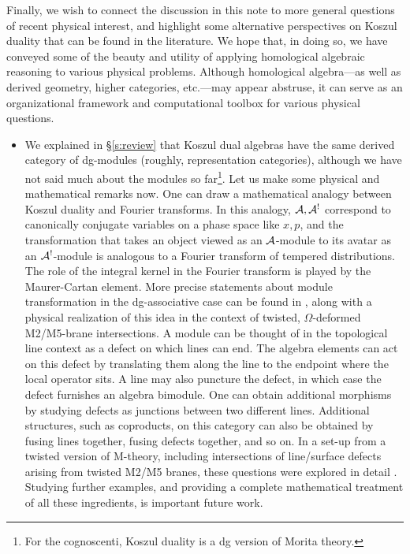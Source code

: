 \documentclass[11pt]{amsart}
\begin{document}
Finally, we wish to connect the discussion in this note to more general questions of recent physical interest, and highlight some alternative perspectives on Koszul duality that can be found in the literature. We hope that, in doing so, we have conveyed some of the beauty and utility of applying homological algebraic reasoning to various physical problems. Although homological algebra---as well as derived geometry, higher categories, etc.---may appear abstruse, it can serve as an organizational framework and computational toolbox for various physical questions.
\begin{itemize}
\item We explained in \S \ref{s:review} that Koszul dual algebras have the same derived category of dg-modules (roughly, representation categories), although we have not said much about the modules so far\footnote{For the cognoscenti, Koszul duality is a dg version of Morita theory.}. Let us make some physical and mathematical remarks now. One can draw a mathematical analogy between Koszul duality and Fourier transforms. In this analogy, $\mathcal A, \mathcal A^{!}$ correspond to canonically conjugate variables on a phase space like $x, p$, and the transformation that takes an object viewed as an $\mathcal A$-module to its avatar as an $\mathcal A^{!}$-module is analogous to a Fourier transform of tempered distributions. The role of the integral kernel in the Fourier transform is played by the Maurer-Cartan element.  More precise statements about module transformation in the dg-associative case can be found in \cite{GO}, along with a physical realization of this idea in the context of twisted, $\Omega$-deformed M2/M5-brane intersections. A module can be thought of in the topological line context as a defect on which lines can end. The algebra elements can act on this defect by translating them along the line to the endpoint where the local operator sits. A line may also puncture the defect, in which case the defect furnishes an algebra bimodule. One can obtain additional morphisms by studying defects as junctions between two different lines.  Additional structures, such as coproducts, on this category can also be obtained by fusing lines together, fusing defects together, and so on. In a set-up from a twisted version of M-theory, including intersections of line/surface defects arising from twisted M2/M5 branes, these questions were explored in detail \cite{GR}. Studying further examples, and providing a complete mathematical treatment of all these ingredients, is important future work. \\

\end{itemize}
\end{document}
